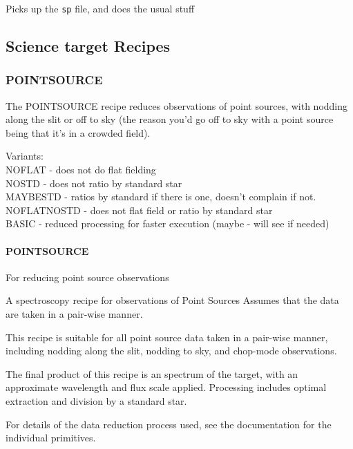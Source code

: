 \documentclass[twoside,11pt]{article}
\renewcommand{\_}{\texttt{\symbol{95}}}
\begin{document}
\mbox{}

Picks up the \texttt{\_sp} file, and does the usual stuff


\subsection{Science target Recipes}

\subsubsection{POINT\_SOURCE}

The POINT\_SOURCE recipe reduces observations of point sources, with
nodding along the slit or off to sky (the reason you'd go off to sky
with a point source being that it's in a crowded field).


Variants: \\
\_NOFLAT - does not do flat fielding \\
\_NOSTD - does not ratio by standard star \\
\_MAYBESTD - ratios by standard if there is one, doesn't complain if not. \\
\_NOFLAT\_NOSTD - does not flat field or ratio by standard star \\
\_BASIC - reduced processing for faster execution (maybe - will see if needed) \\

\paragraph{POINT\_SOURCE\label{POINT_SOURCE}}

For reducing point source observations


\mbox{}

A spectroscopy recipe for observations of Point Sources
Assumes that the data are taken in a pair-wise manner.



This recipe is suitable for all point source data taken in a pair-wise
manner, including nodding along the slit, nodding to sky, and
chop-mode observations.



The final product of this recipe is an spectrum of the target, with an
approximate wavelength and flux scale applied. Processing includes
optimal extraction and division by a standard star.



For details of the data reduction process used, see the documentation
for the individual primitives.
\end{document}
